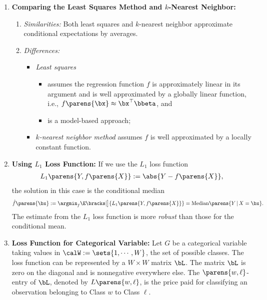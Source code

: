 \documentclass[12pt]{article}
\begin{document}
\begin{enumerate}[label=\textbf{\arabic*.}]
	\item \textbf{Comparing the Least Squares Method and $k$-Nearest Neighbor:} 
	\begin{enumerate}
		\item \textit{Similarities:} Both least squares and $k$-nearest neighbor approximate conditional expectations by averages. 
		\item \textit{Differences:} 
		\begin{itemize}
			\item \textit{Least squares} 
			\begin{itemize}
				\item assumes the regression function $f$ is approximately linear in its argument and is well approximated by a globally linear function, i.e., $f \parens{\bx} \approx \bx^\top \bbeta$, and 
				\item is a model-based approach; 
			\end{itemize}
			\item \textit{$k$-nearest neighbor method} assumes $f$ is well approximated by a locally constant function. 
		\end{itemize}
	\end{enumerate}
	
	\item \textbf{Using $L_1$ Loss Function:} If we use the $L_1$ loss function
	\begin{align*}
		L_1 \parens{Y, f \parens{X}} := \abs{Y - f \parens{X}}, 
	\end{align*}
	the solution in this case is the conditional median 
	\begin{align*}
		\hat{f} \parens{\bx} := \argmin_f \E \bracks[\big]{L_1 \parens{Y, f \parens{X}}} = \mathrm{Median} \parens{Y \,\vert\, X = \bx}. 
	\end{align*}
	The estimate from the $L_1$ loss function is more \emph{robust} than those for the conditional mean. 
	
	\item \textbf{Loss Function for Categorical Variable:} Let $G$ be a categorical variable taking values in $\calW := \sets{1, \cdots, W}$, the set of possible classes. The loss function can be represented by a $W \times W$ matrix $\bL$. The matrix $\bL$ is zero on the diagonal and is nonnegative everywhere else. The $\parens{w, \ell}$-entry of $\bL$, denoted by $L \parens{w, \ell}$, is the price paid for classifying an observation belonging to Class $w$ to Class $\ell$. 
	

\end{enumerate}
\end{document}
